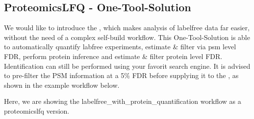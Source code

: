 \subsection{ProteomicsLFQ - One-Tool-Solution}
We would like to introduce the , which makes analysis of labelfree data far easier, without the need of a complex self-build workflow.
This One-Tool-Solution is able to automatically quantify labfree experiments, estimate \& filter via psm level FDR, perform protein inference and estimate \& filter protein level FDR.
Identification can still be performed using your favorit search engine. It is advised to  pre-filter the PSM information at a 5\% FDR before supplying it to the ,
as shown in the example workflow below. 

Here, we are showing the labelfree\_with\_protein\_quantification workflow as a proteomicslfq version. 

      
      


 
